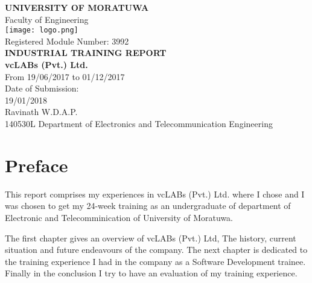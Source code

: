 \documentclass[12pt, a4paper]{report}
\begin{document}

\begin{titlepage}
    \begin{center}
    	\Large
        \vspace{1cm}
        \textbf{UNIVERSITY OF MORATUWA}\\
        Faculty of Engineering\\
        \vspace{.5cm}
        \texttt{[image: logo.png]}\\
        \vspace{0.5cm}
        Registered Module Number: 3992\\
        \vspace{1cm}
        \textbf{INDUSTRIAL TRAINING REPORT}\\
        \vspace{1cm}
        \textbf{vcLABs (Pvt.) Ltd.}\\
        \vspace{1cm}
        From 19/06/2017 to 01/12/2017\\
        \vspace{.5cm}
        Date of Submission:\\
        19/01/2018\\
        \vspace{.5cm}
        Ravinath W.D.A.P.\\
        140530L Department of Electronics and Telecommunication Engineering
    \end{center}
    \afterpage{\restorepagecolor}
\end{titlepage}

\renewcommand{\thepage}{\roman{page}}

\chapter*{Preface}

This report comprises my experiences in vcLABs (Pvt.) Ltd. where I chose and I was chosen to get my 24-week training as an undergraduate of department of Electronic and Telecomminication of University of Moratuwa.

The first chapter gives an overview of vcLABs (Pvt.) Ltd, The history, current situation and future endeavours of the company. The next chapter is dedicated to the training experience I had in the company as a Software Development trainee. Finally in the conclusion I try to have an evaluation of my training experience.
\end{document}
